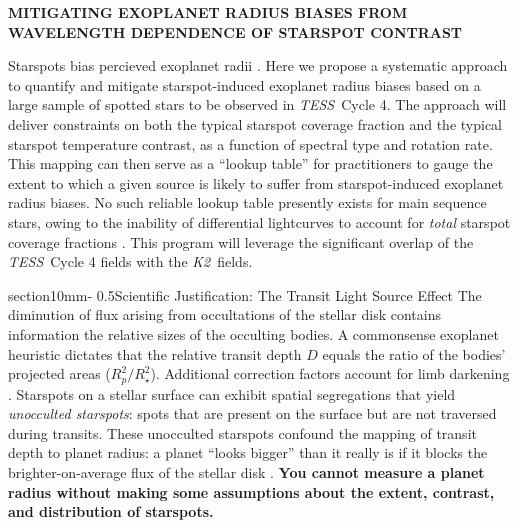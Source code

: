 \documentclass[letterpaper,12pt]{article}
\makeatletter
\renewcommand{\section}{\@startsection%
{section}{1}{0mm}{-\baselineskip}%
{0.5\baselineskip}{\normalfont\Large\bfseries}}%
\newcommand{\tess}{{\it TESS}}
\newcommand{\ktwo}{{\it K2}}
\makeatother
\begin{document}
\pagestyle{plain}



\begin{center}
\bfseries\uppercase{%
Mitigating exoplanet radius biases from wavelength dependence of starspot contrast
}
\end{center}



Starspots bias percieved exoplanet radii \cite{2018ApJ...853..122R}.  Here we propose a systematic approach to quantify and mitigate starspot-induced exoplanet radius biases based on a large sample of spotted stars to be observed in \tess\ Cycle 4.  The approach will deliver constraints on both the typical starspot coverage fraction and the typical starspot temperature contrast, as a function of spectral type and rotation rate.  This mapping can then serve as a ``lookup table'' for practitioners to gauge the extent to which a given source is likely to suffer from starspot-induced exoplanet radius biases.  No such reliable lookup table presently exists for main sequence stars, owing to the inability of differential lightcurves to account for \emph{total} starspot coverage fractions \cite{2018ApJ...865..142B}.  This program will leverage the significant overlap of the \tess\ Cycle 4 fields with the \ktwo\ fields.

\section{Scientific Justification: The Transit Light Source Effect}
The diminution of flux arising from occultations of the stellar disk contains information the relative sizes of the occulting bodies.  A commonsense exoplanet heuristic dictates that the relative transit depth $D$ equals the ratio of the bodies' projected areas ($R_p^2/R_\star^2$).  Additional correction factors account for limb darkening \cite{2002ApJ...580L.171M}.  Starspots on a stellar surface can exhibit spatial segregations
that yield \emph{unocculted starspots}: spots that are present on the surface but are not traversed during transits.  These unocculted starspots confound the mapping of transit depth to planet radius: a planet ``looks bigger'' than it really is if it blocks the brighter-on-average flux of the stellar disk \cite{2018AJ....156...91M}.  \textbf{You cannot measure a planet radius without making some assumptions about the extent, contrast, and distribution of starspots.}
\end{document}
